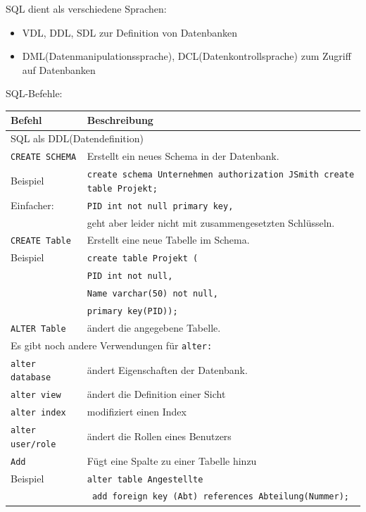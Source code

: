 \documentclass{article}
\begin{document}
SQL dient als verschiedene Sprachen:
\begin{itemize}
  \item VDL, DDL, SDL zur Definition von Datenbanken
  \item DML(Datenmanipulationssprache), DCL(Datenkontrollsprache) zum Zugriff auf Datenbanken
\end{itemize}
SQL-Befehle:
\begin{center}
  \begin{tabular}{|p{4cm}|p{7cm}|}
    \hline
    \textbf{Befehl} & \textbf{Beschreibung} \\
    \hline
    \multicolumn{2}{|p{11cm}|}{SQL als DDL(Datendefinition)} \\
    \hline
    \texttt{CREATE SCHEMA} & Erstellt ein neues Schema in der Datenbank. \\
    \hline    
    Beispiel & \texttt{create schema Unternehmen authorization JSmith create table Projekt;} \\
    \hline
    Einfacher: & \texttt{PID int not null primary key,} \\
    & geht aber leider nicht mit zusammengesetzten Schlüsseln. \\
    \hline
    \texttt{CREATE Table} & Erstellt eine neue Tabelle im Schema. \\
    \hline
    Beispiel & \texttt{create table Projekt (} \\ & \texttt{PID int not null,} \\ & \texttt{Name varchar(50) not null, } \\ & \texttt{primary key(PID));} \\
    \hline
    \texttt{ALTER Table} & ändert die angegebene Tabelle. \\
    \hline
    \multicolumn{2}{|p{11cm}|}{Es gibt noch andere Verwendungen für \texttt{alter:}} \\
    \texttt{alter database} & ändert Eigenschaften der Datenbank. \\
    \texttt{alter view} & ändert die Definition einer Sicht \\
    \texttt{alter index} & modifiziert einen Index \\
    \texttt{alter user/role} & ändert die Rollen eines Benutzers \\
    \hline
    \texttt{Add} & Fügt eine Spalte zu einer Tabelle hinzu \\
    \hline
    Beispiel & \texttt{alter table Angestellte} \\
    & \texttt{ add foreign key (Abt) references Abteilung(Nummer);} \\

\end{tabular}
\end{center}
\end{document}
